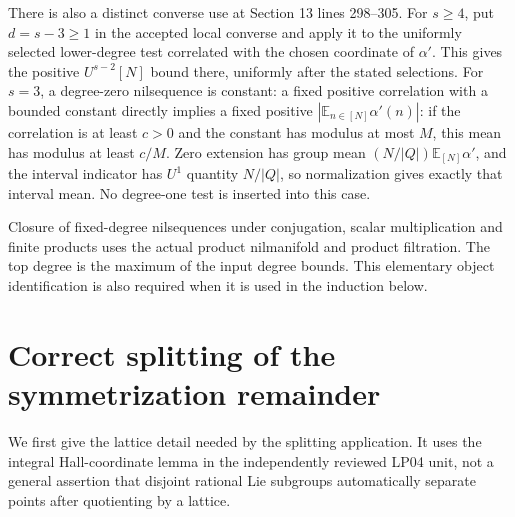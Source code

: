\documentclass[11pt]{article}
\begin{document}
There is also a distinct converse use at Section 13 lines 298--305.
For $s\geq4$, put $d=s-3\geq1$ in the accepted local converse and
apply it to the uniformly selected lower-degree test correlated
with the chosen coordinate of $\alpha'$. This gives the positive
$U^{s-2}[N]$ bound there, uniformly after the stated selections.
For $s=3$, a degree-zero nilsequence is constant: a fixed positive
correlation with a bounded constant directly implies a fixed
positive $|\mathbb E_{n\in[N]}\alpha'(n)|$: if the correlation is
at least $c>0$ and the constant has modulus at most $M$, this mean
has modulus at least $c/M$. Zero extension has group mean
$(N/|Q|)\mathbb E_{[N]}\alpha'$, and the interval indicator has
$U^1$ quantity $N/|Q|$, so normalization gives exactly that interval
mean. No degree-one test is inserted into this case.

Closure of fixed-degree nilsequences under conjugation, scalar
multiplication and finite products uses the actual product nilmanifold and
product filtration. The top degree is the maximum of the input degree
bounds. This elementary object identification is also required when it is
used in the induction below.

\section{Correct splitting of the symmetrization remainder}

We first give the lattice detail needed by the splitting application.
It uses the integral Hall-coordinate lemma in the independently reviewed
LP04 unit, not a general assertion that disjoint rational Lie subgroups
automatically separate points after quotienting by a lattice.
\end{document}
